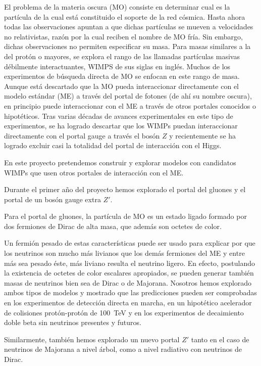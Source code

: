 El problema de la materia oscura (MO) consiste en determinar cual es la
partícula de la cual está constituido el soporte de la red
cósmica. Hasta ahora todas las observaciones apuntan a que dichas
partículas se mueven a velocidades no relativistas, razón por la cual
reciben el nombre de MO fría.
Sin embargo, dichas observaciones no permiten especificar su
masa. Para masas similares a la del protón o mayores, se explora
el rango de las llamadas partículas masivas débilmente interactuantes, WIMPS de sus siglas en inglés.
Muchos de los experimentos de búsqueda
directa de MO se enfocan en este rango de masa.  Aunque
está descartado que la MO pueda interaccionar directamente
con el modelo estándar (ME) a través 
del portal de fotones (de ahí su nombre oscura), en principio puede
interaccionar con el ME a través de otros portales
conocidos o hipotéticos.  Tras varias décadas de avances
experimentales en este tipo de experimentos, se ha logrado descartar
que los WIMPs puedan interaccionar directamente con el portal gauge a
través el bosón $Z$ y recientemente se ha logrado excluir casi la
totalidad del portal de interacción con el Higgs.

En este proyecto pretendemos construir y explorar modelos con
candidatos WIMPs que usen otros portales de interacción con el ME.

Durante el primer año del proyecto hemos explorado el portal del
gluones y el portal de un bosón gauge extra $Z'$.

Para el portal de
gluones, la partícula de MO es un estado ligado formado
por dos fermiones de Dirac de alta masa, que además
son octetes de color.

Un fermión pesado de estas características puede ser usado para
explicar por que los neutrinos son mucho más livianos que los demás
fermiones del ME y entre más sea pesado éste, más liviano resulta el
neutrino ligero.
%
En efecto, postulando  la existencia
de octetes de color escalares apropiados, se pueden generar también masas de
neutrinos bien sea de Dirac o de Majorana. Nosotros hemos explorado
ambos tipos de modelos y mostrado que las predicciones pueden ser
comprobadas en los experimentos de detección directa en marcha, en un hipotético
acelerador de colisiones protón-protón de 100~TeV y en los experimentos
de decaimiento doble beta sin neutrinos presentes y futuros.

Similarmente, también hemos explorado un nuevo portal
$Z'$  tanto en el caso de neutrinos de Majorana a nivel
árbol, como a nivel radiativo con neutrinos de Dirac.




